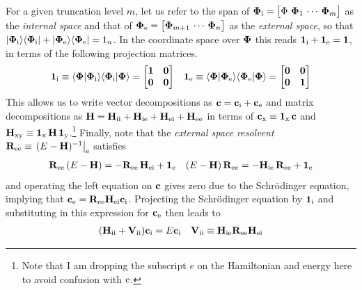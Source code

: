 \documentclass[11pt]{article}
\numberwithin{equation}{section}
\begin{document}
\begin{rmk}
\label{rmk:lowdin-partitioning}
For a given truncation level $m$, let us refer to the span of
$\bm{\F}_\mr{i}=\pma{\F\ \bm{\F}_1\,\cd\,\bm{\F}_m}$
as the
\textit{internal space}
and that of
$\bm{\F}_\mr{e}=\pma{\bm{\F}_{m+1}\,\cd\,\bm{\F}_n}$
as the
\textit{external space}, so that
$
  |\mathbf{\Phi }_{\mathrm{i}}\rangle
  \langle\mathbf{\Phi }_{\mathrm{i}}|
+
  |\mathbf{\Phi }_{\mathrm{e}}\rangle
  \langle\mathbf{\Phi }_{\mathrm{e}}|
=
  1_n
$.
In the coordinate space over $\mathbf{\Phi }$ this reads
$
  \mathbf{1}_{\mathrm{i}}
+
  \mathbf{1}_{\mathrm{e}}
=
  \mathbf{1}
$,
in terms of the following projection matrices.
\begin{align}
  \bo{1}_\mr{i}
\equiv
  \ip{\bo{\F}|\bo{\F}_\mr{i}}
  \ip{\bo{\F}_\mr{i}|\bo{\F}}
=
\pma[l]{
  \bo{1} & \bo{0} \\
  \bo{0} & \bo{0}
}
&&
  \bo{1}_\mr{e}
\equiv
  \ip{\bo{\F}|\bo{\F}_\mr{e}}
  \ip{\bo{\F}_\mr{e}|\bo{\F}}
=
\pma[l]{
  \bo{0} & \bo{0} \\
  \bo{0} & \bo{1}
}
\end{align}
This allows us to write vector decompositions as
$
  \mathbf{c}
=
  \mathbf{c}_{\mathrm{i}}
+
  \mathbf{c}_{\mathrm{e}}
$
and matrix decompositions as
$
  \mathbf{H}
=
  \mathbf{H}_{\mathrm{ii}}
+
  \mathbf{H}_{\mathrm{ie}}
+
  \mathbf{H}_{\mathrm{ei}}
+
  \mathbf{H}_{\mathrm{ee}}
$
in terms of
$
  \mathbf{c}_{\mathrm{x}}
\equiv
  \mathbf{1}_{\mathrm{x}}\,
  \mathbf{c}
$
and
$
  \mathbf{H}_{\mathrm{xy}}
\equiv
  \mathbf{1}_{\mathrm{x}}\,
  \mathbf{H}\,
  \mathbf{1}_{\mathrm{y}}
$.\footnote{Note that I am dropping the subscript $e$ on the Hamiltonian and energy here to avoid confusion with $\mathrm{e}$.}
Finally, note that the \textit{external space resolvent}
$
  \mathbf{R}_{\mathrm{ee}}
\equiv
\left.
  (
    E
  -
    \mathbf{H}
  )^{-1}
\right|_{\mathrm{e}}
$
satisfies
\begin{align}
  \mathbf{R}_{\mathrm{ee}}\,
  (
    E
  -
    \mathbf{H}
  )
=
-
  \mathbf{R}_{\mathrm{ee}}\,
  \mathbf{H}_{\mathrm{ei}}
+
  \mathbf{1}_{\mathrm{e}}
&&
  (
    E
  -
    \mathbf{H}
  )\,
  \mathbf{R}_{\mathrm{ee}}
=
-
  \mathbf{H}_{\mathrm{ie}}\,
  \mathbf{R}_{\mathrm{ee}}
+
  \mathbf{1}_{\mathrm{e}}
\end{align}
and operating the left equation on $\mathbf{c}$ gives zero due to the Schr\"odinger equation, implying that
$
  \mathbf{c}_{\mathrm{e}}
=
  \mathbf{R}_{\mathrm{ee}}
  \mathbf{H}_{\mathrm{ei}}
  \mathbf{c}_{\mathrm{i}}
$.
Projecting the Schr\"odinger equation by $\mathbf{1}_{\mathrm{i}}$ and substituting in this expression for $\mathbf{c}_{\mathrm{e}}$ then leads to
\begin{align}
  (
    \mathbf{H}_{\mathrm{ii}}
  +
    \mathbf{V}_{\mathrm{ii}}
  )
  \mathbf{c}_{\mathrm{i}}
=
  E
  \mathbf{c}_{\mathrm{i}}
&&
  \mathbf{V}_{\mathrm{ii}}
\equiv
  \mathbf{H}_{\mathrm{ie}}
  \mathbf{R}_{\mathrm{ee}}
  \mathbf{H}_{\mathrm{ei}}
\end{align}

\end{rmk}
\end{document}
